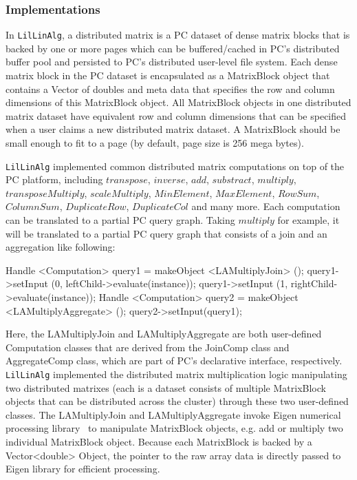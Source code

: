 \subsubsection {Implementations}
In \texttt{LilLinAlg}, a distributed matrix is a PC dataset of dense matrix
blocks that is backed by one or more pages which can be buffered/cached in PC's distributed buffer pool and
persisted to PC's distributed user-level file system. Each dense matrix
block in the PC dataset is encapsulated as a MatrixBlock object that contains a
Vector of doubles and meta data that specifies the row and column
dimensions of this MatrixBlock object. All MatrixBlock objects in one distributed
matrix dataset have equivalent row and column dimensions that can be
specified when a user claims a new distributed matrix dataset. A
MatrixBlock should be small enough to fit to a page (by default, page size
is 256 mega bytes).

\texttt{LilLinAlg} implemented common distributed matrix
computations on top of the PC platform, including $transpose$,
$inverse$, $add$, $substract$, $multiply$, $transposeMultiply$, $scaleMultiply$, $MinElement$,
$MaxElement$, $RowSum$, $ColumnSum$, $DuplicateRow$, $DuplicateCol$
and many more. Each computation can be translated to a partial PC query
graph. Taking $multiply$ for example, it will be translated to a partial
PC query graph that consists of a join and an aggregation like following:

\begin{code}
Handle <Computation> query1 = makeObject <LAMultiplyJoin> ();
query1->setInput (0, leftChild->evaluate(instance));
query1->setInput (1, rightChild->evaluate(instance));
Handle <Computation> query2 = makeObject <LAMultiplyAggregate> ();
query2->setInput(query1);
\end{code}

Here, the LAMultiplyJoin and LAMultiplyAggregate are both user-defined Computation classes that are
derived from the JoinComp class and AggregateComp class, which are
part of PC's declarative interface,  respectively. \texttt{LilLinAlg}
implemented the distributed matrix multiplication logic manipulating
two distributed matrixes (each is a dataset consists of multiple
MatrixBlock objects that can be distributed across the cluster) through these
two user-defined classes. The LAMultiplyJoin
and LAMultiplyAggregate invoke Eigen numerical processing
library~\cite{eigen} to manipulate MatrixBlock objects, e.g. add or
multiply two individual MatrixBlock object. Because each
MatrixBlock is backed by a Vector<double> Object, the pointer to the
raw array data is directly passed to Eigen library for efficient processing.

